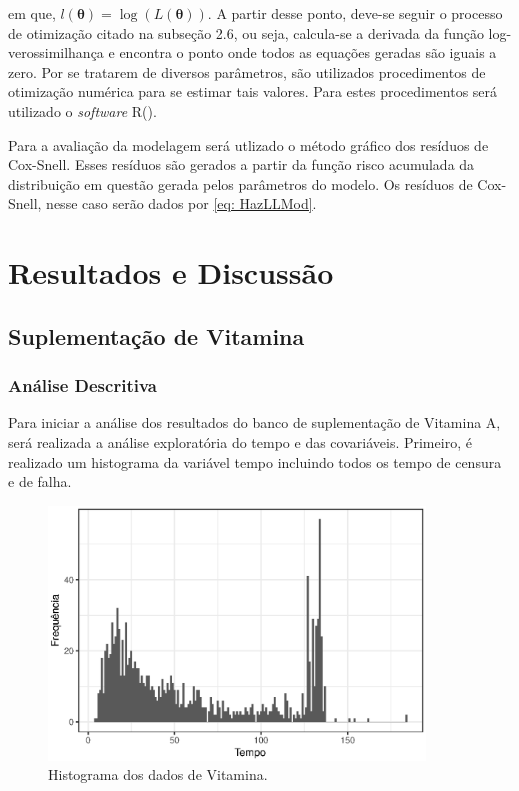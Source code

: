 \documentclass[a4paper,12pt]{article}
\begin{document}
\noindent em que, $l(\boldsymbol{\theta}) = \log(L(\boldsymbol{\theta}))$. A partir desse ponto, deve-se seguir o processo de otimização citado na subseção 2.6, ou seja, calcula-se a derivada da função log-verossimilhança e encontra o ponto onde todos as equações geradas são iguais a zero. Por se tratarem de diversos parâmetros, são utilizados procedimentos de otimização numérica para se estimar tais valores. Para estes procedimentos será utilizado o \textit{software} R(\cite{R}).

Para a avaliação da modelagem será utlizado o método gráfico dos resíduos de Cox-Snell. Esses resíduos são gerados a partir da função risco acumulada da distribuição em questão gerada pelos parâmetros do modelo. Os resíduos de Cox-Snell, nesse caso serão dados por \ref{eq: HazLLMod}.


\newpage

\section{Resultados e Discussão}

\subsection{Suplementação de Vitamina}
\subsubsection{Análise Descritiva}

Para iniciar a análise dos resultados do banco de suplementação de Vitamina A, será realizada a análise exploratória do tempo e das covariáveis. Primeiro, é realizado um histograma da variável tempo incluindo todos os tempo de censura e de falha.

\begin{figure}[H]
  \begin{center}
    \includegraphics[width=10cm]{hist_vit}
    \caption{Histograma dos dados de Vitamina.}
  \end{center}
\end{figure}
\end{document}
